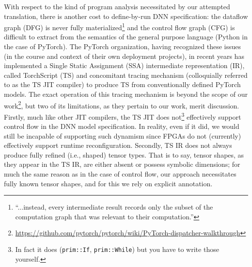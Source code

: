 With respect to the kind of program analysis necessitated by our attempted translation, there is another cost to define-by-run DNN specification: the dataflow graph (DFG) is never fully materialized\footnote{``...instead, every intermediate result records only the subset of the computation graph that was relevant to their computation.''\cite{paszke2017automatic}} and the control flow graph (CFG) is difficult to extract from the semantics of the general purpose language (Python in the case of PyTorch).
The PyTorch organization, having recognized these issues (in the course and context of their own deployment projects), in recent years has implemented a Single Static Assignment (SSA) intermediate representation (IR), called TorchScript (TS) and concomitant tracing mechanism (colloquially referred to as the TS JIT compiler) to produce TS from conventionally defined PyTorch models.
The exact operation of this tracing mechanism is beyond the scope of our work\footnote{\url{https://github.com/pytorch/pytorch/wiki/PyTorch-dispatcher-walkthrough}}, but two of its limitations, as they pertain to our work, merit discussion.
Firstly, much like other JIT compilers, the TS JIT does not\footnote{In fact it does (\texttt{prim::If}, \texttt{prim::While}) but you have to write those yourself.} effectively support control flow in the DNN model specification.
In reality, even if it did, we would still be incapable of supporting such dynamism since FPGAs do not (currently) effectively support runtime reconfiguration\cite{reconfigfpga}.
Secondly, TS IR does not always produce fully refined (i.e., shaped) tensor types.
That is to say, tensor shapes, as they appear in the TS IR, are either absent or possess symbolic dimensions\cite{10.1145/3211346.3211348}; for much the same reason as in the case of control flow, our approach necessitates fully known tensor shapes, and for this we rely on explicit annotation.

